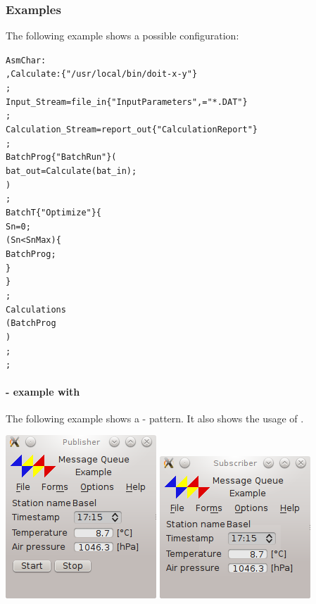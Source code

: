 \subsubsection{Examples}
\label{sec:opexamples}
The following example shows a possible \OPERATOR{} configuration:


\begin{boxedminipage}[t]{\linewidth}
\begin{alltt}
\OPERATOR
  \PROCESS
      AsmChar: \MATHEMATICA
    , Calculate: \BATCH \{"/usr/local/bin/doit -x -y"\}
    ;
  \FILESTREAM
      Input_Stream = file_in \{"Input Parameters", \FILTER="*.DAT"\}
    ;
  \REPORTSTREAM
      Calculation_Stream = report_out \{"Calculation Report"\}
    ;
  \PROCESSGROUP
       BatchProg \{"Batch Run"\}(
         bat_out = Calculate( bat_in );
       )
    ;
  \TASK
    BatchT \{"Optimize"\}\{
      Sn = 0;
      \WHILE( Sn < SnMax )\{
        \RUN BatchProg;
      \}
    \}
   ;
  \MENU
      Calculations
        ( \PROCESS BatchProg
        )
    ;
\END \OPERATOR;
\end{alltt}
\end{boxedminipage}


\newpage
\paragraph{\MESSAGEQUEUE{} \PUBLISH{} - \SUBSCRIBE{} example with \TIMER{}}
\label{sec:opexamples:messagequeue:publishsubscribe}

The following example shows a \PUBLISH{} - \SUBSCRIBE{} \MESSAGEQUEUE{} pattern. It also
shows the usage of \TIMER{}.

\vspace{1cm}
\includegraphics[valign=t]{examples/messageQueue/publisher}
\hspace{2cm}
\includegraphics[valign=t]{examples/messageQueue/subscriber}
\vspace{1cm}

